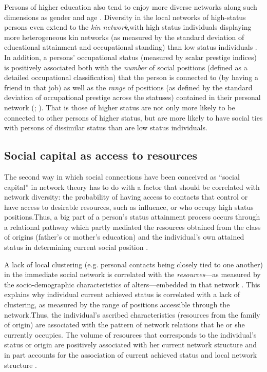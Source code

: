 \documentclass[12pt]{article}
\begin{document}
Persons of higher education also tend to enjoy more diverse networks along such dimensions as gender and age \citep{fischer82}. Diversity in the local networks of high-status persons even extend to the \emph{kin network},with high status individuals displaying more heterogeneous kin networks (as measured by the standard deviation of educational attainment and occupational standing) than low status individuals \citep{goldstein_warren00}. In addition, a persons' occupational status (measured by scalar prestige indices) is positively associated both with the \emph{number} of social positions (defined as a detailed occupational classification) that the person is connected to (by having a friend in that job) as well as the \emph{range} of positions (as defined by the standard deviation of occupational prestige across the statuses) contained in their personal network (\citealp[90]{lin01b}; \citealp{lin_dumin86}). That is those of higher status are not only more likely to be connected to other persons of higher status, but are more likely to have social ties with persons of dissimilar status than are low status individuals.

\subsection{Social capital as access to resources}
The second way in which social connections have been conceived as ``social capital'' in network theory has to do with a factor that should be correlated with network diversity: the probability of having access to contacts that control or have access to desirable resources, such as influence, or who occupy high status positions.Thus, a big part of a person's status attainment process occurs through a relational pathway which partly mediated the resources obtained from the class of origins (father's or mother's education) and the individual's own attained status in determining current social position \citep{lin01a}.

A lack of local clustering (e.g. personal contacts being closely tied to one another) in the immediate social network is correlated with the \emph{resources}---as measured by the socio-demographic characteristics of alters---embedded in that network \citep{lin01a}. This explains why individual current achieved status is correlated with a lack of clustering, as measured by the range of positions accessible through the network.Thus, the individual's ascribed characteristics (resources from the family of origin) are associated with the pattern of network relations that he or she currently occupies. The volume of resources that corresponds to the individual's status or origin are positively associated with her current network structure and in part accounts for the association of current achieved status and local network structure \citep{lin90, lin01b}. 
\end{document}
